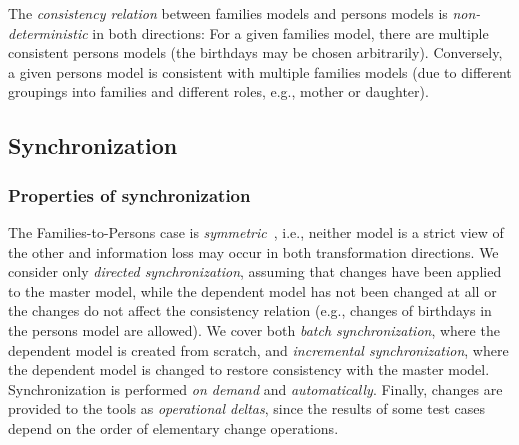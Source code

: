 The \emph{consistency relation} between families models and persons models is \emph{non-deterministic} in both directions: For a given families model, there are multiple consistent persons models (the birthdays may be chosen arbitrarily). Conversely, a given persons model is consistent with multiple families models (due to different groupings into families and different roles, e.g., mother or daughter).

\subsection{Synchronization}
\label{sec:ConsistencyRestoration}

%

\subsubsection{Properties of synchronization}

The Families-to-Persons case is \emph{symmetric}~\cite{Diskin2014}, i.e., neither model is a strict view of the other and information loss may occur in both transformation directions. We consider only \emph{directed synchronization}, assuming that changes have been applied to the master model, while the dependent model has not been changed at all or the changes do not affect the consistency relation (e.g., changes of birthdays in the persons model are allowed). We cover both \emph{batch synchronization}, where the dependent model is created from scratch, and \emph{incremental synchronization}, where the dependent model is changed to restore consistency with the master model. Synchronization is performed  \emph{on demand} and \emph{automatically}. Finally, changes are provided to the tools as \emph{operational deltas}, since the results of some test cases depend on the order of elementary change operations.

